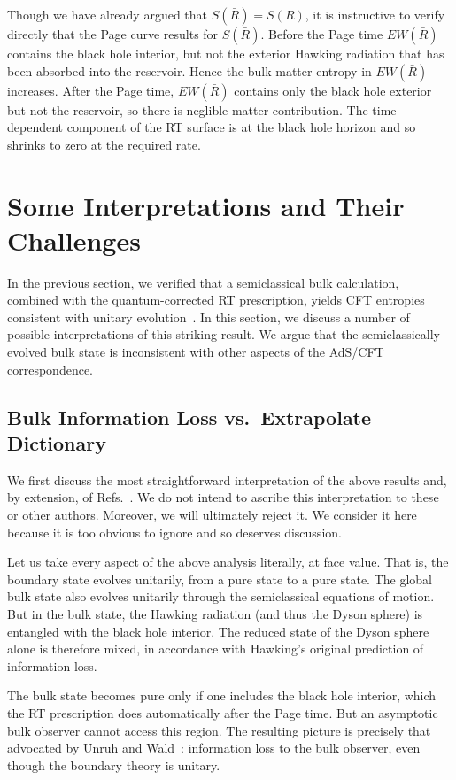 \documentclass[12pt,letterpaper]{article}
\begin{document}
Though we have already argued that $S(\bar R)=S(R)$, it is instructive to verify directly that the Page curve results for $S(\bar R)$. Before the Page time $EW(\bar R)$ contains the black hole interior, but not the exterior Hawking radiation that has been absorbed into the reservoir. Hence the bulk matter entropy in $EW(\bar R)$ increases. After the Page time, $EW(\bar R)$ contains only the black hole exterior but not the reservoir, so there is neglible matter contribution. The time-dependent component of the RT surface is at the black hole horizon and so shrinks to zero at the required rate.

\section{Some Interpretations and Their Challenges}
\label{sec-interpretations}

In the previous section, we verified that a semiclassical bulk calculation, combined with the quantum-corrected RT prescription, yields CFT entropies consistent with unitary evolution~\cite{Pen19,AEMM}. In this section, we discuss a number of possible interpretations of this striking result. We argue that the semiclassically evolved bulk state is inconsistent with other aspects of the AdS/CFT correspondence.

\subsection{Bulk Information Loss vs.\ Extrapolate Dictionary}
\label{sec-infoloss}

We first discuss the most straightforward interpretation of the above results and, by extension, of Refs.~\cite{Pen19, AEMM}. We do not intend to ascribe this interpretation to these or other authors. Moreover, we will ultimately reject it. We consider it here because it is too obvious to ignore and so deserves discussion.

Let us take every aspect of the above analysis literally, at face value. That is, the boundary state evolves unitarily, from a pure state to a pure state. The global bulk state also evolves unitarily through the semiclassical equations of motion. But in the bulk state, the Hawking radiation (and thus the Dyson sphere) is entangled with the black hole interior. The reduced state of the Dyson sphere alone is therefore mixed, in accordance with Hawking's original prediction of information loss. 

The bulk state becomes pure only if one includes the black hole interior, which the RT prescription does automatically after the Page time. But an asymptotic bulk observer cannot access this region. The resulting picture is precisely that advocated by Unruh and Wald~\cite{UnrWal17}: information loss to the bulk observer, even though the boundary theory is unitary. 
\end{document}
